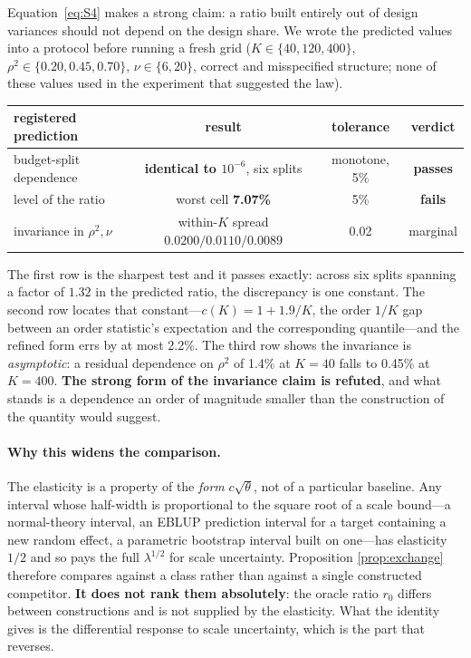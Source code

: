 Equation~\eqref{eq:S4} makes a strong claim: a ratio built entirely out of design
variances should not depend on the design share. We wrote the predicted values
into a protocol before running a fresh grid ($K\in\{40,120,400\}$,
$\rho^2\in\{0.20,0.45,0.70\}$, $\nu\in\{6,20\}$, correct and misspecified
structure; none of these values used in the experiment that suggested the law).

\begin{center}
\begin{singlespace}
\small
\begin{tabular}{lccc}
\toprule
registered prediction & result & tolerance & verdict\\
\midrule
budget-split dependence & \textbf{identical to $10^{-6}$}, six splits & monotone, 5\% & \textbf{passes}\\
level of the ratio & worst cell \textbf{7.07\%} & 5\% & \textbf{fails}\\
invariance in $\rho^2,\nu$ & within-$K$ spread $0.0200/0.0110/0.0089$ & 0.02 & marginal\\
\bottomrule
\end{tabular}
\end{singlespace}
\end{center}

The first row is the sharpest test and it passes exactly: across six splits
spanning a factor of $1.32$ in the predicted ratio, the discrepancy is one
constant. The second row locates that constant---$c(K)=1+1.9/K$, the order
$1/K$ gap between an order statistic's expectation and the corresponding
quantile---and the refined form errs by at most 2.2\%. The third row shows the
invariance is \emph{asymptotic}: a residual dependence on $\rho^2$ of 1.4\% at
$K=40$ falls to 0.45\% at $K=400$. \textbf{The strong form of the invariance
claim is refuted}, and what stands is a dependence an order of magnitude smaller
than the construction of the quantity would suggest.

\paragraph{Why this widens the comparison.} The elasticity is a property of the
\emph{form} $c\sqrt{\theta}$, not of a particular baseline. Any interval whose
half-width is proportional to the square root of a scale bound---a normal-theory
interval, an EBLUP prediction interval for a target containing a new random
effect, a parametric bootstrap interval built on one---has elasticity $1/2$ and
so pays the full $\lambda^{1/2}$ for scale uncertainty. Proposition
\ref{prop:exchange} therefore compares against a class rather than against a
single constructed competitor. \textbf{It does not rank them absolutely}: the
oracle ratio $r_0$ differs between constructions and is not supplied by the
elasticity. What the identity gives is the differential response to scale
uncertainty, which is the part that reverses.

